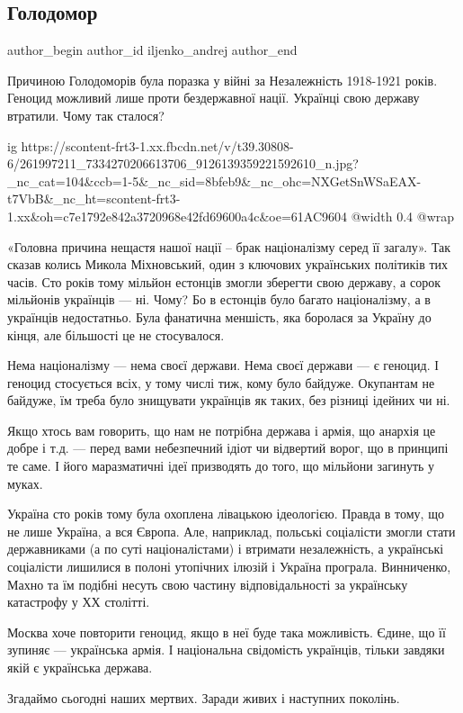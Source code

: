  
 
 
 
 
 
\subsection{Голодомор}
\label{sec:27_11_2021.fb.iljenko_andrej.1.golodomor}
 
\ifcmt
 author_begin
   author_id iljenko_andrej
 author_end
\fi

Причиною Голодоморів була поразка у війні за Незалежність 1918-1921 років.
Геноцид можливий лише проти бездержавної нації. Українці свою державу втратили.
Чому так сталося?

\ifcmt
  ig https://scontent-frt3-1.xx.fbcdn.net/v/t39.30808-6/261997211_7334270206613706_9126139359221592610_n.jpg?_nc_cat=104&ccb=1-5&_nc_sid=8bfeb9&_nc_ohc=NXGetSnWSaEAX-t7VbB&_nc_ht=scontent-frt3-1.xx&oh=c7e1792e842a3720968e42fd69600a4c&oe=61AC9604
  @width 0.4
  @wrap 
\fi

«Головна причина нещастя нашої нації – брак націоналізму серед її загалу». Так
сказав колись Микола Міхновський, один з ключових українських політиків тих
часів. Сто років тому мільйон естонців змогли зберегти свою державу, а сорок
мільйонів українців — ні. Чому? Бо в естонців було багато націоналізму, а в
українців недостатньо. Була фанатична меншість, яка боролася за Україну до
кінця, але більшості це не стосувалося. 

Нема націоналізму — нема своєї держави. Нема своєї держави — є геноцид. І
геноцид стосується всіх, у тому числі тиж, кому було байдуже. Окупантам не
байдуже, їм треба було знищувати українців як таких, без різниці ідейних чи ні.

Якщо хтось вам говорить, що нам не потрібна держава і армія, що анархія це
добре і т.д. — перед вами небезпечний ідіот чи відвертий ворог, що в принципі
те саме. І його маразматичні ідеї призводять до того, що мільйони загинуть у
муках. 

Україна сто років тому була охоплена лівацькою ідеологією. Правда в тому, що не
лише Україна, а вся Європа. Але, наприклад, польські соціалісти змогли стати
державниками (а по суті націоналістами) і втримати незалежність, а українські
соціалісти лишилися в полоні утопічних ілюзій і Україна програла. Винниченко,
Махно та їм подібні несуть свою частину відповідальності за українську
катастрофу у ХХ столітті. 

Москва хоче повторити геноцид, якщо в неї буде така можливість. Єдине, що її
зупиняє — українська армія. І національна свідомість українців, тільки завдяки
якій є українська держава. 

Згадаймо сьогодні наших мертвих. Заради живих і наступних поколінь.
